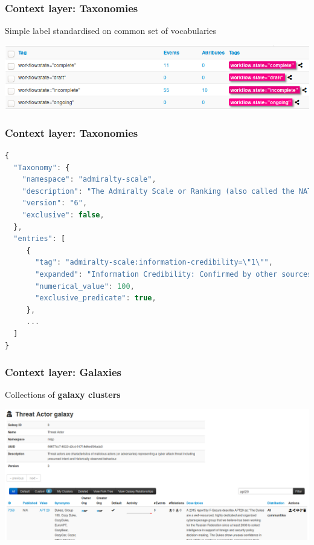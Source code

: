 \begin{frame}
    \frametitle{Context layer: Taxonomies}
    Simple label standardised on common set of vocabularies
    \vspace{1em}
    \begin{center}
        \includegraphics[width=1.0\linewidth]{taxonomy-workflow.png}
    \end{center}
\end{frame}

\begin{frame}[fragile]
    \frametitle{Context layer: Taxonomies}
    \begin{lstlisting}[language=javascript,firstnumber=1]
{
  "Taxonomy": {
    "namespace": "admiralty-scale",
    "description": "The Admiralty Scale or Ranking (also called the NATO System)...",
    "version": "6",
    "exclusive": false,
  },
  "entries": [
     {
       "tag": "admiralty-scale:information-credibility=\"1\"",
       "expanded": "Information Credibility: Confirmed by other sources",
       "numerical_value": 100,
       "exclusive_predicate": true,
     },
     ...
  ]
}
\end{lstlisting}
\end{frame}

\begin{frame}
    \frametitle{Context layer: Galaxies}
    Collections of {\bf galaxy clusters}
    \begin{center}
        \includegraphics[width=1.0\linewidth]{screenshots/galaxy.png}
    \end{center}
\end{frame}

